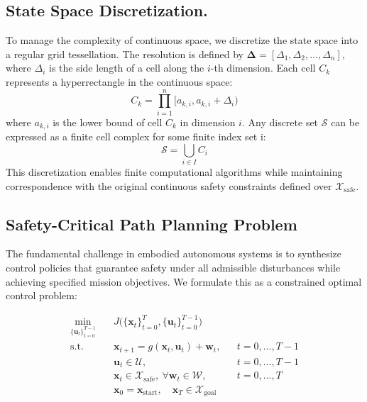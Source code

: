 \documentclass[conference]{IEEEtran}
\begin{document}
\subsection{State Space Discretization.}
To manage the complexity of continuous space, we discretize the state space into a regular grid tessellation. The resolution is defined by $\boldsymbol{\Delta} = [\Delta_1, \Delta_2, \ldots, \Delta_n]$, where $\Delta_i$ is the side length of a cell along the $i$-th dimension. Each cell $C_k$ represents a hyperrectangle in the continuous space:
\begin{equation}
C_k = \prod_{i=1}^n [a_{k,i}, a_{k,i} + \Delta_i)
\label{eq:cell_definition}
\end{equation}
where $a_{k,i}$ is the lower bound of cell $C_k$ in dimension $i$. Any discrete set $\mathcal{S}$ can be expressed as a finite cell complex for some finite index set i:
\begin{equation}
\mathcal{S} = \bigcup_{i \in I} C_i
\label{eq:discrete_set_union}
\end{equation}
This discretization enables finite computational algorithms while maintaining correspondence with the original continuous safety constraints defined over $\mathcal{X}_{\text{safe}}$. 

\subsection{Safety-Critical Path Planning Problem}

The fundamental challenge in embodied autonomous systems is to synthesize control policies that guarantee safety under all admissible disturbances while achieving specified mission objectives. We formulate this as a constrained optimal control problem:

\begin{subequations}
\label{eq:discrete_path_planning}
\begin{align}
\min_{\{\mathbf u_t\}_{t=0}^{T-1}} \quad 
    & J\!\bigl(\{\mathbf x_t\}_{t=0}^{T},\{\mathbf u_t\}_{t=0}^{T-1}\bigr) 
    \label{eq:disc_objective}\\[4pt]
\text{s.t.}\quad 
    & \mathbf x_{t+1} = g(\mathbf x_t,\mathbf u_t) + \mathbf w_t, 
      && t = 0,\dots,T-1 
      \label{eq:disc_dyn}\\
    & \mathbf u_t \in \mathcal U, 
      && t = 0,\dots,T-1 
      \label{eq:disc_ctrl}\\
    & \mathbf x_t \in \mathcal X_{\mathrm{safe}},\ \forall\mathbf w_t\!\in\!\mathcal W,
      && t = 0,\dots,T
      \label{eq:disc_safe}\\
    & \mathbf x_0 = \mathbf x_{\mathrm{start}},\quad 
      \mathbf x_T \in \mathcal X_{\mathrm{goal}}
      \label{eq:disc_boundary}
\end{align}
\end{subequations}
\end{document}
